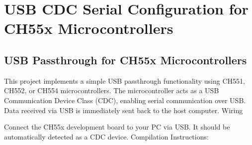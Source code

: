 \documentclass[letterpaper,10pt,english]{sphinxmanual}
\begin{document}
\begin{sphinxVerbatim}[commandchars=\\\{\}]

\end{sphinxVerbatim}


\section{USB CDC Serial Configuration for CH55x Microcontrollers}
\label{\detokenize{cdc:usb-cdc-serial-configuration-for-ch55x-microcontrollers}}

\subsection{USB Passthrough for CH55x Microcontrollers}
\label{\detokenize{cdc:usb-passthrough-for-ch55x-microcontrollers}}
\sphinxAtStartPar
This project implements a simple USB passthrough functionality using CH551, CH552, or CH554 microcontrollers. The microcontroller acts as a USB Communication Device Class (CDC), enabling serial communication over USB. Data received via USB is immediately sent back to the host computer.
Wiring

\sphinxAtStartPar
Connect the CH55x development board to your PC via USB. It should be automatically detected as a CDC device.
Compilation Instructions:
\end{document}
